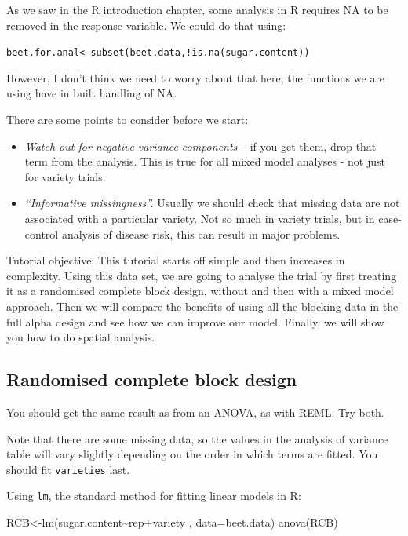 \documentclass[
]{book}
\makeatletter
\newenvironment{Shaded}{\begin{snugshade}}{\end{snugshade}}
\newcommand{\AttributeTok}[1]{\textcolor[rgb]{0.77,0.63,0.00}{#1}}
\newcommand{\FunctionTok}[1]{\textcolor[rgb]{0.00,0.00,0.00}{#1}}
\newcommand{\NormalTok}[1]{#1}
\newcommand{\OtherTok}[1]{\textcolor[rgb]{0.56,0.35,0.01}{#1}}
\newcommand{\SpecialCharTok}[1]{\textcolor[rgb]{0.00,0.00,0.00}{#1}}
\newenvironment{kframe}{%
\medskip{}
\setlength{\fboxsep}{.8em}
 \def\at@end@of@kframe{}%
 \ifinner\ifhmode%
  \def\at@end@of@kframe{\end{minipage}}%
  \begin{minipage}{\columnwidth}%
 \fi\fi%
 \def\FrameCommand##1{\hskip\@totalleftmargin \hskip-\fboxsep
 \colorbox{shadecolor}{##1}\hskip-\fboxsep
     \hskip-\linewidth \hskip-\@totalleftmargin \hskip\columnwidth}%
 \MakeFramed {\advance\hsize-\width
   \@totalleftmargin\z@ \linewidth\hsize
   \@setminipage}}%
 {\par\unskip\endMakeFramed%
 \at@end@of@kframe}
\newenvironment{rmdblock}[1]
  {
  \begin{itemize}
  \renewcommand{\labelitemi}{
    \raisebox{-.7\height}[0pt][0pt]{
      {\setkeys{Gin}{width=3em,keepaspectratio}\texttt{[image: images/\#1]}}
    }
  }
  \setlength{\fboxsep}{1em}
  \begin{kframe}
  \item
  }
  {
  \end{kframe}
  \end{itemize}
  }
\newenvironment{rmdnote}
  {\begin{rmdblock}{note}}
  {\end{rmdblock}}
\makeatother
\begin{document}
As we saw in the R introduction chapter, some analysis in R requires NA to be removed in the response variable. We could do that using:

\texttt{beet.for.anal\textless{}-subset(beet.data,!is.na(sugar.content))}

However, I don't think we need to worry about that here; the functions we are using have in built handling of NA.

There are some points to consider before we start:

\begin{itemize}
\item
  \emph{Watch out for negative variance components} -- if you get them, drop that term from the analysis. This is true for all mixed model analyses - not just for variety trials.
\item
  \emph{``Informative missingness''.} Usually we should check that missing data are not associated with a particular variety. Not so much in variety trials, but in case-control analysis of disease risk, this can result in major problems.
\end{itemize}

\begin{rmdnote}
Tutorial objective: This tutorial starts off simple and then increases in complexity. Using this data set, we are going to analyse the trial by first treating it as a randomised complete block design, without and then with a mixed model approach. Then we will compare the benefits of using all the blocking data in the full alpha design and see how we can improve our model. Finally, we will show you how to do spatial analysis.
\end{rmdnote}

\hypertarget{randomised-complete-block-design}{%
\subsection{Randomised complete block design}\label{randomised-complete-block-design}}

You should get the same result as from an ANOVA, as with REML. Try both.

Note that there are some missing data, so the values in the analysis of variance table will vary slightly depending on the order in which terms are fitted. You should fit \texttt{varieties} last.

Using \texttt{lm}, the standard method for fitting linear models in R:

\begin{Shaded}
\begin{Highlighting}[]
\NormalTok{RCB}\OtherTok{\textless{}{-}}\FunctionTok{lm}\NormalTok{(sugar.content}\SpecialCharTok{\textasciitilde{}}\NormalTok{rep}\SpecialCharTok{+}\NormalTok{variety , }\AttributeTok{data=}\NormalTok{beet.data)}
\FunctionTok{anova}\NormalTok{(RCB)}
\end{Highlighting}
\end{Shaded}
\end{document}
